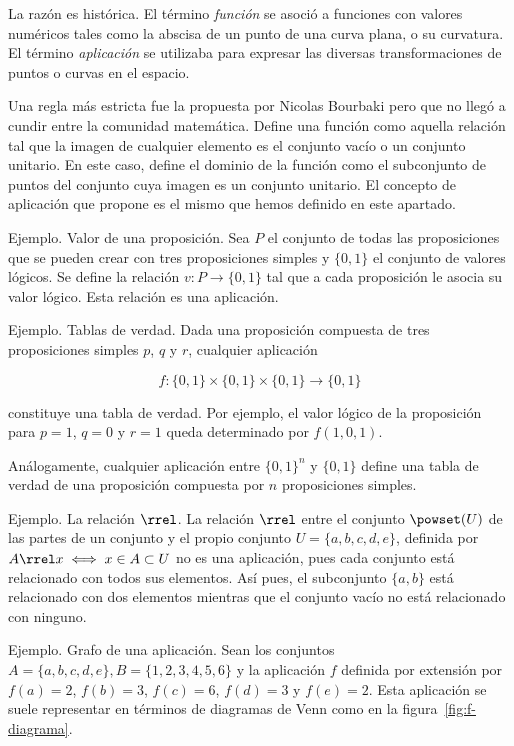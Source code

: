 La razón es histórica. El término \emph{función} se asoció a funciones con
valores numéricos tales como la abscisa de un punto de una curva plana, o su
curvatura. El término \emph{aplicación} se utilizaba para expresar las
diversas transformaciones de puntos o curvas en el espacio.

Una regla más estricta fue la propuesta por Nicolas Bourbaki pero que no
llegó a cundir entre la comunidad matemática. Define una función como
aquella relación tal que la imagen de cualquier elemento es el conjunto
vacío o un conjunto unitario. En este caso, define el dominio de la función
como el subconjunto de puntos del conjunto cuya imagen es un conjunto
unitario. El concepto de aplicación que propone es el mismo que hemos
definido en este apartado.

Ejemplo. Valor de una proposición. Sea $P$ el conjunto de todas las
proposiciones que se pueden crear con tres proposiciones simples y $\{0,
1\}$ el conjunto de valores lógicos. Se define la relación $v: P
\longrightarrow \{0, 1\}$ tal que a cada proposición le asocia su valor
lógico. Esta relación es una aplicación.

Ejemplo. Tablas de verdad. Dada una proposición compuesta de tres
proposiciones simples $p$, $q$ y $r$, cualquier aplicación

$$ f: \{0, 1\} \times \{0, 1\} \times \{0, 1\} \longrightarrow \{0, 1\} $$

\noindent constituye una tabla de verdad. Por ejemplo, el valor lógico de la
proposición para $p = 1$, $q = 0$ y $r = 1$ queda determinado por $f(1, 0,
1)$.

Análogamente, cualquier aplicación entre $\{0, 1\}^n$ y $\{0, 1\}$ define
una tabla de verdad de una proposición compuesta por $n$ proposiciones
simples.

Ejemplo. La relación $\rrel$. La relación $\rrel$ entre el conjunto
$\powset(U)$ de las partes de un conjunto y el propio conjunto $U = \{a, b,
c, d, e\}$, definida por $A \rrel x \iff x \in A \subset U$ no es una
aplicación, pues cada conjunto está relacionado con todos sus elementos. Así
pues, el subconjunto $\{a, b\}$ está relacionado con dos elementos mientras
que el conjunto vacío no está relacionado con ninguno.

Ejemplo. Grafo de una aplicación. Sean los conjuntos $A = \{a, b, c, d, e\},
B = \{1, 2, 3, 4, 5, 6\}$ y la aplicación $f$ definida por extensión por
$f(a) = 2$, $f(b) = 3$, $f(c) = 6$, $f(d) = 3$ y $f(e) = 2$. Esta aplicación
se suele representar en términos de diagramas de Venn como en la
figura~\ref{fig:f-diagrama}.

